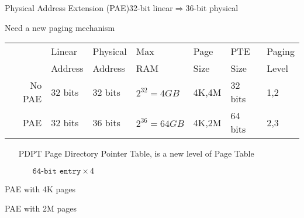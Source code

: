 \begin{frame}{Physical Address Extension (PAE)}{32-bit linear$\Rightarrow{}$36-bit physical}
  \begin{block}{Need a new paging mechanism}
    \begin{scriptsize}
      \begin{center}
        \begin{tabular}{r|llllll}
          &Linear&Physical&Max&Page&PTE&Paging\\
          &Address&Address&RAM&Size&Size&Level\\\hline
          No PAE&32 bits&32 bits&$2^{32}=4GB$&4K,4M&32 bits&1,2\\
          PAE&32 bits&36 bits&$2^{36}=64GB$&4K,2M&64 bits&2,3
        \end{tabular}
      \end{center}
    \end{scriptsize}
  \end{block}
  \vspace{1em}
  \begin{minipage}{.49\textwidth}
    \begin{itemize}
    \item[PDPT] Page Directory Pointer Table, is a new level of Page Table
      \begin{itemize}
      \item[] $\texttt{64-bit entry}\times{}4$
      \end{itemize}
    \end{itemize}
  \end{minipage}\hfill
  \begin{minipage}{.49\textwidth}
    \begin{center}
    \end{center}
  \end{minipage}
\end{frame}

\begin{frame}{PAE with 4K pages}
  \begin{center}
  \end{center}
\end{frame}

\begin{frame}{PAE with 2M pages}
  \begin{center}
  \end{center}
\end{frame}

